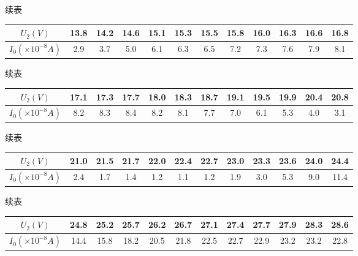 \documentclass{article}
\begin{document}
    续表

    \begin{center}
        \begin{tabular}{|c|c|c|c|c|c|c|c|c|c|c|c|}
            \hline
            $U_2(V)$ & 13.8  & 14.2  & 14.6  & 15.1  & 15.3  & 15.5  & 15.8  & 16.0  & 16.3  & 16.6  & 16.8  \bigstrut\\
            \hline
            $I_0(\times 10^{-8}A)$ & 2.9   & 3.7   & 5.0   & 6.1   & 6.3   & 6.5   & 7.2   & 7.3   & 7.6   & 7.9   & 8.1  \bigstrut\\
            \hline
        \end{tabular}%
    \end{center}

    续表

    \begin{center}
        \begin{tabular}{|c|c|c|c|c|c|c|c|c|c|c|c|}
            \hline
            $U_2(V)$ & 17.1  & 17.3  & 17.7  & 18.0  & 18.3  & 18.7  & 19.1  & 19.5  & 19.9  & 20.4  & 20.8  \bigstrut\\
            \hline
            $I_0(\times 10^{-8}A)$ & 8.2   & 8.3   & 8.4   & 8.2   & 8.1   & 7.7   & 7.0   & 6.1   & 5.3   & 4.0   & 3.1  \bigstrut\\
            \hline
        \end{tabular}%
    \end{center}
    
    续表

    \begin{center}
        \begin{tabular}{|c|c|c|c|c|c|c|c|c|c|c|c|}
            \hline
            $U_2(V)$ & 21.0  & 21.5  & 21.7  & 22.0  & 22.4  & 22.7  & 23.0  & 23.3  & 23.6  & 24.0  & 24.4  \bigstrut\\
            \hline
            $I_0(\times 10^{-8}A)$ & 2.4   & 1.7   & 1.4   & 1.2   & 1.1   & 1.2   & 1.9   & 3.0   & 5.3   & 9.0   & 11.4  \bigstrut\\
            \hline
        \end{tabular}%
    \end{center}
        
    续表

    \begin{center}
        \begin{tabular}{|c|c|c|c|c|c|c|c|c|c|c|c|}
            \hline
            $U_2(V)$ & 24.8  & 25.2  & 25.7  & 26.2  & 26.7  & 27.1  & 27.4  & 27.7  & 27.9  & 28.3  & 28.6  \bigstrut\\
            \hline
            $I_0(\times 10^{-8}A)$ & 14.4  & 15.8  & 18.2  & 20.5  & 21.8  & 22.5  & 22.7  & 22.9  & 23.2  & 23.2  & 22.8  \bigstrut\\
            \hline
        \end{tabular}%
    \end{center}
\end{document}
